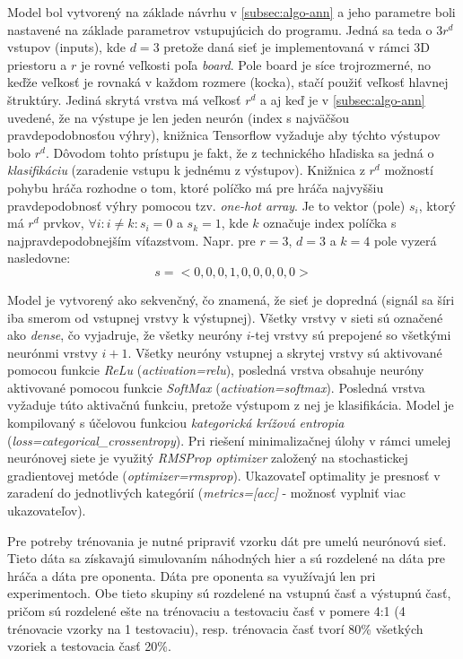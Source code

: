 Model bol vytvorený na základe návrhu v \autoref{subsec:algo-ann} a jeho parametre boli nastavené na základe
parametrov vstupujúcich do programu.
Jedná sa teda o $3r^d$ vstupov (inputs), kde $d=3$ pretože daná sieť je implementovaná v rámci 3D priestoru a $r$ je
rovné veľkosti poľa \emph{board}.
Pole board je síce trojrozmerné, no keďže veľkosť je rovnaká v každom rozmere (kocka), stačí použiť veľkosť hlavnej
štruktúry.
Jediná skrytá vrstva má veľkosť $r^d$ a aj keď je v \autoref{subsec:algo-ann} uvedené, že na výstupe je len
jeden neurón (index s najväčšou pravdepodobnosťou výhry), knižnica Tensorflow vyžaduje aby týchto výstupov bolo $r^d$.
Dôvodom tohto prístupu je fakt, že z technického hľadiska sa jedná o \emph{klasifikáciu} (zaradenie vstupu k jednému z
výstupov).
Knižnica z $r^d$ možností pohybu hráča rozhodne o tom, ktoré políčko má pre hráča najvyššiu pravdepodobnosť výhry
pomocou tzv. \emph{one-hot array}\cite{one_hot}.
Je to vektor (pole) $s_i$, ktorý má $r^d$ prvkov, $\forall i : i\neq k : s_i=0$ a $s_k=1$, kde $k$ označuje index
políčka s najpravdepodobnejším víťazstvom.
Napr. pre $r=3$, $d=3$ a $k=4$ pole vyzerá nasledovne:
\begin{equation}
    s = <0, 0, 0, 1, 0, 0, 0, 0, 0>
\end{equation}

Model je vytvorený ako sekvenčný, čo znamená, že sieť je dopredná (signál sa šíri iba smerom od vstupnej vrstvy k
výstupnej).
Všetky vrstvy v sieti sú označené ako \emph{dense}, čo vyjadruje, že všetky neuróny $i$-tej vrstvy sú prepojené so
všetkými neurónmi vrstvy $i+1$.
Všetky neuróny vstupnej a skrytej vrstvy sú aktivované pomocou funkcie \emph{ReLu} (\emph{activation=relu}), posledná
vrstva obsahuje neuróny aktivované pomocou funkcie \emph{SoftMax} (\emph{activation=softmax}).
Posledná vrstva vyžaduje túto aktivačnú funkciu, pretože výstupom z nej je klasifikácia.
Model je kompilovaný s účelovou funkciou \emph{kategorická krížová entropia} (\emph{loss=categorical\_crossentropy}).
Pri riešení minimalizačnej úlohy v rámci umelej neurónovej siete je využitý \emph{RMSProp optimizer} založený na
stochastickej gradientovej metóde (\emph{optimizer=rmsprop}).
Ukazovateľ optimality je presnosť v zaradení do jednotlivých kategórií (\emph{metrics=[acc]} - možnosť vyplniť viac
ukazovateľov).

Pre potreby trénovania je nutné pripraviť vzorku dát pre umelú neurónovú sieť.
Tieto dáta sa získavajú simulovaním náhodných hier a sú rozdelené na dáta pre hráča a dáta pre oponenta.
Dáta pre oponenta sa využívajú len pri experimentoch.
Obe tieto skupiny sú rozdelené na vstupnú časť a výstupnú časť, pričom sú rozdelené ešte na trénovaciu a testovaciu časť
v pomere 4:1 (4 trénovacie vzorky na 1 testovaciu), resp. trénovacia časť tvorí 80\% všetkých vzoriek a testovacia časť
20\%.

